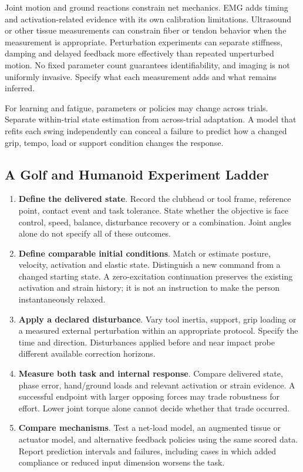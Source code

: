Joint motion and ground reactions constrain net mechanics. EMG adds timing and
activation-related evidence with its own calibration limitations. Ultrasound
or other tissue measurements can constrain fiber or tendon behavior when the
measurement is appropriate. Perturbation experiments can separate stiffness,
damping and delayed feedback more effectively than repeated unperturbed motion.
No fixed parameter count guarantees identifiability, and imaging is not uniformly
invasive. Specify what each measurement adds and what remains inferred.

For learning and fatigue, parameters or policies may change across trials.
Separate within-trial state estimation from across-trial adaptation. A model
that refits each swing independently can conceal a failure to predict how a
changed grip, tempo, load or support condition changes the response.

\subsection{A Golf and Humanoid Experiment Ladder}

\begin{enumerate}
\item \textbf{Define the delivered state}. Record the clubhead or tool frame,
reference point, contact event and task tolerance. State whether the objective
is face control, speed, balance, disturbance recovery or a combination. Joint
angles alone do not specify all of these outcomes.
\item \textbf{Define comparable initial conditions}. Match or estimate posture,
velocity, activation and elastic state. Distinguish a new command from a
changed starting state. A zero-excitation continuation preserves the existing
activation and strain history; it is not an instruction to make the person
instantaneously relaxed.
\item \textbf{Apply a declared disturbance}. Vary tool inertia, support,
grip loading or a measured external perturbation within an appropriate protocol.
Specify the time and direction. Disturbances applied before and near impact
probe different available correction horizons.
\item \textbf{Measure both task and internal response}. Compare delivered
state, phase error, hand/ground loads and relevant activation or strain evidence.
A successful endpoint with larger opposing forces may trade robustness for
effort. Lower joint torque alone cannot decide whether that trade occurred.
\item \textbf{Compare mechanisms}. Test a net-load model, an augmented tissue
or actuator model, and alternative feedback policies using the same scored
data. Report prediction intervals and failures, including cases in which added
compliance or reduced input dimension worsens the task.
\end{enumerate}

